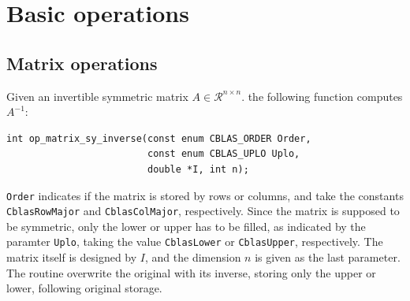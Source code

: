 \chapter{Basic operations}

\section{Matrix operations}

Given an invertible symmetric matrix $A \in \mathcal{R}^{n \times n}$. the
following function computes $A^{-1}$:
\begin{verbatim}
int op_matrix_sy_inverse(const enum CBLAS_ORDER Order,
                         const enum CBLAS_UPLO Uplo,
                         double *I, int n);
\end{verbatim}
\verb|Order| indicates if the matrix is stored by rows or columns,
and take the constants \verb|CblasRowMajor| and \verb|CblasColMajor|,
respectively.
Since the matrix is supposed to be symmetric, only the lower or upper
has to be filled, as indicated by the paramter \texttt{Uplo}, taking
the value \verb|CblasLower| or \verb|CblasUpper|, respectively.
The matrix itself is designed by $I$, and the dimension $n$ is given as the last parameter.
The routine overwrite the original with its inverse, storing only the upper
or lower, following original storage.
